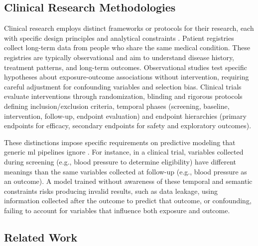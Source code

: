 \documentclass[conference,onecolumn]{IEEEtran}
\begin{document}
\subsection{Clinical Research Methodologies}  
\label{subsec:clinical_research}
  
Clinical research employs distinct frameworks or protocols for their research, each with specific design principles and analytical constraints \cite{kahlert2017control}. Patient registries collect long-term data from people who share the same medical condition. These registries are typically observational and aim to understand disease history, treatment patterns, and long-term outcomes. Observational studies test specific hypotheses about exposure-outcome associations without intervention, requiring careful adjustment for confounding variables and selection bias. Clinical trials evaluate interventions through randomization, blinding and rigorous protocols defining inclusion/exclusion criteria, temporal phases (screening, baseline, intervention, follow-up, endpoint evaluation) and endpoint hierarchies (primary endpoints for efficacy, secondary endpoints for safety and exploratory outcomes).

These distinctions impose specific requirements on predictive modeling that generic \gls{ml} pipelines ignore \cite{gao2025confounder}. For instance, in a clinical trial, variables collected during screening (e.g., blood pressure to determine eligibility) have different meanings than the same variables collected at follow-up (e.g., blood pressure as an outcome). A model trained without awareness of these temporal and semantic constraints risks producing invalid results, such as data leakage, using information collected after the outcome to predict that outcome, or confounding, failing to account for variables that influence both exposure and outcome.

\subsection{Related Work}  
\label{subsec:related_work}  
\end{document}
